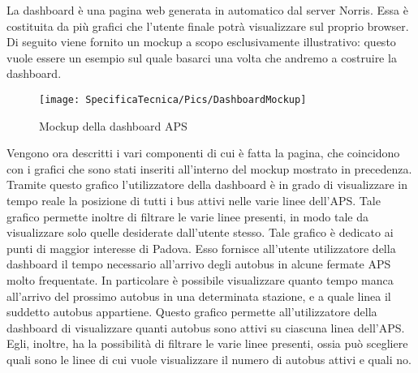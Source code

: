 	La dashboard è una pagina web generata in automatico dal server Norris. Essa è costituita da più grafici che l'utente finale potrà visualizzare sul proprio browser. Di seguito viene fornito un mockup a scopo esclusivamente illustrativo: questo vuole essere un esempio sul quale basarci una volta che andremo a costruire la dashboard.
	\begin{figure}[H]\centering
        \texttt{[image: SpecificaTecnica/Pics/DashboardMockup]}
        \caption{Mockup della dashboard APS}
    \end{figure}
    Vengono ora descritti i vari componenti di cui è fatta la pagina, che coincidono con i grafici che sono stati inseriti all'interno del mockup mostrato in precedenza.
    		Tramite questo grafico l'utilizzatore della dashboard è in grado di visualizzare in tempo reale la posizione di tutti i bus attivi nelle varie linee dell'APS. Tale grafico permette inoltre di filtrare le varie linee presenti, in modo tale da visualizzare solo quelle desiderate dall'utente stesso.
    		Tale grafico è dedicato ai punti di maggior interesse di Padova. Esso fornisce all'utente utilizzatore della dashboard il tempo necessario all'arrivo degli autobus in alcune fermate APS molto frequentate. In particolare è possibile visualizzare quanto tempo manca all'arrivo del prossimo autobus in una determinata stazione, e a quale linea il suddetto autobus appartiene.
    		Questo grafico permette all'utilizzatore della dashboard di visualizzare quanti autobus sono attivi su ciascuna linea dell'APS. Egli, inoltre, ha la possibilità di filtrare le varie linee presenti, ossia può scegliere quali sono le linee di cui vuole visualizzare il numero di autobus attivi e quali no.
